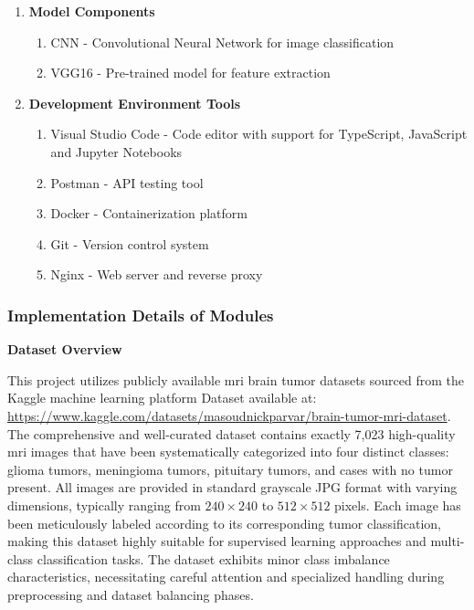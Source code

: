 \begin{enumerate}[label=\roman*.]
    \item \textbf{Model Components}
          \begin{enumerate}[label=$\bullet$]
              \item CNN \-- Convolutional Neural Network for image classification
              \item VGG16 \-- Pre-trained model for feature extraction
          \end{enumerate}

    \item \textbf{Development Environment Tools}
          \begin{enumerate}[label=$\bullet$]
              \item Visual Studio Code \-- Code editor with support for TypeScript, JavaScript and
                    Jupyter Notebooks
              \item Postman \-- API testing tool
              \item Docker \-- Containerization platform
              \item Git \-- Version control system
              \item Nginx \-- Web server and reverse proxy
          \end{enumerate}

\end{enumerate}

\subsubsection{Implementation Details of Modules}

\textbf{Dataset Overview}

This project utilizes publicly available \gls{mri} brain tumor datasets sourced
from the Kaggle machine learning platform Dataset available at:
\url{https://www.kaggle.com/datasets/masoudnickparvar/brain-tumor-mri-dataset}.
The comprehensive and well-curated dataset contains exactly 7,023 high-quality
\gls{mri} images that have been systematically categorized into four distinct
classes: glioma tumors, meningioma tumors, pituitary tumors, and cases with no
tumor present. All images are provided in standard grayscale JPG format with
varying dimensions, typically ranging from $240 \times 240$ to $512 \times 512$
pixels. Each image has been meticulously labeled according to its corresponding
tumor classification, making this dataset highly suitable for supervised
learning approaches and multi-class classification tasks. The dataset exhibits
minor class imbalance characteristics, necessitating careful attention and
specialized handling during preprocessing and dataset balancing phases.

